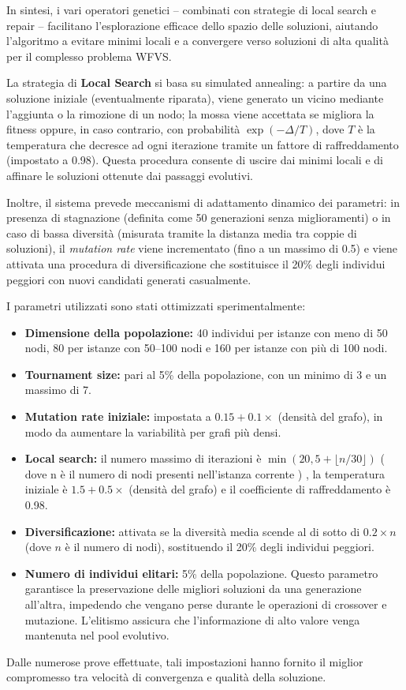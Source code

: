 \documentclass[12pt,a4paper,twoside]{article}
\begin{document}
\begin{itemize}
\end{itemize}

In sintesi, i vari operatori genetici – combinati con strategie di local search e repair – facilitano l'esplorazione efficace dello spazio delle soluzioni, aiutando l'algoritmo a evitare minimi locali e a convergere verso soluzioni di alta qualità per il complesso problema WFVS.


La strategia di \textbf{Local Search} si basa su simulated annealing: a partire da una soluzione iniziale (eventualmente riparata), viene generato un vicino mediante l'aggiunta o la rimozione di un nodo; la mossa viene accettata se migliora la fitness oppure, in caso contrario, con probabilità \(\exp(-\Delta/T)\), dove \(T\) è la temperatura che decresce ad ogni iterazione tramite un fattore di raffreddamento (impostato a 0.98). Questa procedura consente di uscire dai minimi locali e di affinare le soluzioni ottenute dai passaggi evolutivi.

Inoltre, il sistema prevede meccanismi di adattamento dinamico dei parametri: in presenza di stagnazione (definita come 50 generazioni senza miglioramenti) o in caso di bassa diversità (misurata tramite la distanza media tra coppie di soluzioni), il \emph{mutation rate} viene incrementato (fino a un massimo di 0.5) e viene attivata una procedura di diversificazione che sostituisce il 20\% degli individui peggiori con nuovi candidati generati casualmente.

I parametri utilizzati sono stati ottimizzati sperimentalmente:
\begin{itemize}
    \item\textbf{Dimensione della popolazione:} 40 individui per istanze con meno di 50 nodi, 80 per istanze con 50--100 nodi e 160 per istanze con più di 100 nodi.
    \item \textbf{Tournament size:} pari al 5\% della popolazione, con un minimo di 3 e un massimo di 7.
    \item \textbf{Mutation rate iniziale:} impostata a \(0.15 + 0.1 \times\) (densità del grafo), in modo da aumentare la variabilità per grafi più densi.
    \item \textbf{Local search:} il numero massimo di iterazioni è \(\min(20, 5 + \lfloor n/30 \rfloor)\) ( dove n è il numero di nodi presenti nell'istanza corrente ) , la temperatura iniziale è \(1.5 + 0.5 \times\) (densità del grafo) e il coefficiente di raffreddamento è 0.98.
    \item \textbf{Diversificazione:} attivata se la diversità media scende al di sotto di \(0.2 \times n\) (dove \(n\) è il numero di nodi), sostituendo il 20\% degli individui peggiori.
     \item \textbf{Numero di individui elitari:} 5\% della popolazione.  
    Questo parametro garantisce la preservazione delle migliori soluzioni da una generazione all'altra, impedendo che vengano perse durante le operazioni di crossover e mutazione. L'elitismo assicura che l'informazione di alto valore venga mantenuta nel pool evolutivo.
\end{itemize}
Dalle numerose prove effettuate, tali impostazioni hanno fornito il miglior compromesso tra velocità di convergenza e qualità della soluzione.
\end{document}
